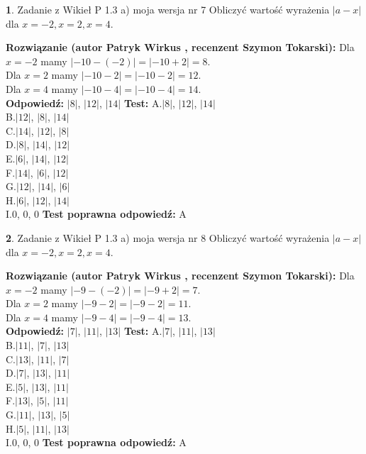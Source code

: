 \documentclass[12pt, a4paper]{article}
\theoremstyle{definition} %
\newtheorem{zad}{}
\newcommand{\zadStart}[1]{\begin{zad}#1\newline}
\newcommand{\zadStop}{\end{zad}}
\newcommand{\rozwStart}[2]{\noindent \textbf{Rozwiązanie (autor #1 , recenzent #2): }\newline}
\newcommand{\rozwStop}{\newline}
\newcommand{\odpStart}{\noindent \textbf{Odpowiedź:}\newline}
\newcommand{\odpStop}{\newline}
\newcommand{\testStart}{\noindent \textbf{Test:}\newline}
\newcommand{\testStop}{\newline}
\newcommand{\kluczStart}{\noindent \textbf{Test poprawna odpowiedź:}\newline}
\newcommand{\kluczStop}{\newline}
\begin{document}
\zadStart{Zadanie z Wikieł P 1.3 a) moja wersja nr 7}
Obliczyć wartość wyrażenia $|a - x|$ dla $x=-2,x=2,x=4$.
\zadStop
\rozwStart{Patryk Wirkus}{Szymon Tokarski}
Dla $x = -2$ mamy $|-10 - (-2)| = |-10 + 2| = 8$.\\
Dla $x = 2$ mamy $|-10 - 2| = |-10 - 2| = 12$.\\
Dla $x = 4$ mamy $|-10 - 4| = |-10 - 4| = 14$.\\
\rozwStop
\odpStart
$|8|$, $|12|$, $|14|$
\odpStop
\testStart
A.$|8|$, $|12|$, $|14|$\\
B.$|12|$, $|8|$, $|14|$\\
C.$|14|$, $|12|$, $|8|$\\
D.$|8|$, $|14|$, $|12|$\\
E.$|6|$, $|14|$, $|12|$\\
F.$|14|$, $|6|$, $|12|$\\
G.$|12|$, $|14|$, $|6|$\\
H.$|6|$, $|12|$, $|14|$\\
I.$0$, $0$, $0$
\testStop
\kluczStart
A
\kluczStop



\zadStart{Zadanie z Wikieł P 1.3 a) moja wersja nr 8}
Obliczyć wartość wyrażenia $|a - x|$ dla $x=-2,x=2,x=4$.
\zadStop
\rozwStart{Patryk Wirkus}{Szymon Tokarski}
Dla $x = -2$ mamy $|-9 - (-2)| = |-9 + 2| = 7$.\\
Dla $x = 2$ mamy $|-9 - 2| = |-9 - 2| = 11$.\\
Dla $x = 4$ mamy $|-9 - 4| = |-9 - 4| = 13$.\\
\rozwStop
\odpStart
$|7|$, $|11|$, $|13|$
\odpStop
\testStart
A.$|7|$, $|11|$, $|13|$\\
B.$|11|$, $|7|$, $|13|$\\
C.$|13|$, $|11|$, $|7|$\\
D.$|7|$, $|13|$, $|11|$\\
E.$|5|$, $|13|$, $|11|$\\
F.$|13|$, $|5|$, $|11|$\\
G.$|11|$, $|13|$, $|5|$\\
H.$|5|$, $|11|$, $|13|$\\
I.$0$, $0$, $0$
\testStop
\kluczStart
A
\kluczStop
\end{document}
